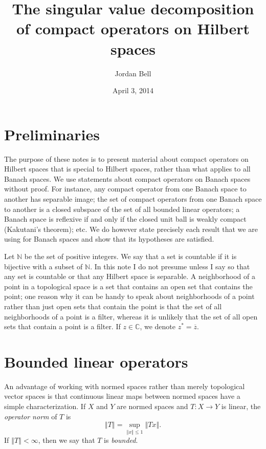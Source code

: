 \documentclass{article}
\newcommand{\norm}[1]{\left\Vert #1 \right\Vert}
\theoremstyle{definition}
\begin{document}
\title{The singular value decomposition of compact operators on Hilbert spaces}
\author{Jordan Bell}
\date{April 3, 2014}

\maketitle

\section{Preliminaries}
The purpose of these notes is to present material about compact operators on Hilbert spaces that is special  to Hilbert spaces, rather than what applies to all Banach spaces. 
We use statements about compact operators on Banach spaces without proof.  For instance, any compact  operator
from one Banach space to another has separable image; the set of compact operators from one Banach space to another is a closed subspace of the set of all bounded
linear operators; a Banach space is reflexive if and only if the closed unit ball is weakly compact (Kakutani's theorem); etc. We do however state precisely each result that we are using for Banach spaces and show that  its hypotheses are satisfied.

Let
$\mathbb{N}$ be the set of positive integers. We say that a set is countable if it is bijective with a subset of
$\mathbb{N}$.
In this note I do not presume unless I say so that any set is countable or that any Hilbert space is separable. A neighborhood of a point in a topological space is a set that contains an open set that
contains the point; one reason why it can be handy to speak about neighborhoods of a point rather than just open sets that contain the point is that
the set of all neighborhoods of a point is a filter, whereas it is unlikely that the set of all open sets that contain a point is a filter. If $z \in \mathbb{C}$, we denote $z^* = \overline{z}$.

\section{Bounded linear operators}
An advantage of working with normed spaces rather than merely topological vector spaces is that continuous linear maps between normed spaces have a
simple characterization. If $X$ and $Y$ are normed spaces and $T:X \to Y$ is linear, the {\em operator norm} of $T$ is
\[
\norm{T} = \sup_{\norm{x} \leq 1} \norm{Tx}.
\]
If $\norm{T} < \infty$, then we say that $T$ is {\em bounded}. 
\end{document}
